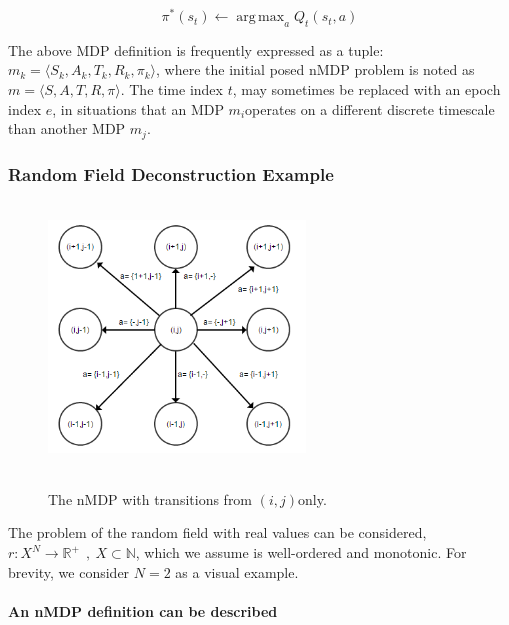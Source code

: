 \documentclass[compsoc,journal,letterpaper,10pt,draftcls,twocolumn]{IEEEtran}
\DeclareMathOperator*{\argmax}{arg\,max}
\begin{document}
\begin{equation}
\pi^{*}\left( s_{t} \right) \leftarrow \argmax_{a}{Q_{t}(s_{t},a)} 
\end{equation}

The above MDP definition is frequently expressed as a tuple:
\(m_{k} = \langle S_{k}, A_{k}, T_{k}, R_{k}, \pi_{k} \rangle\), where the initial posed
nMDP problem is noted as
\(m = \langle S, A, T, R,\pi \rangle \). The time index
\(t\), may sometimes be replaced with an epoch index \(e\), in
situations that an MDP \(m_{i}\)operates on a different discrete
timescale than another MDP \(m_{j}\).

\subsubsection{Random Field Deconstruction
Example}\label{random-field-deconstruction-example}

\begin{center}
\begin{figure}
\includegraphics[width=2.68750in,height=2.80556in]{media/image1.png}\\
\caption{\label{fig:figure1}The nMDP with transitions from \((i,j)\)only.}
\end{figure}
\end{center}

The
problem of the random field with real values can be considered,
\(r:X^{N} \rightarrow \mathbb{R}^{+}\ \ ,\ X\mathbb{\subset N}\), which
we assume is well-ordered and monotonic. For brevity, we consider
\(N = 2\) as a visual example.

\paragraph{An nMDP definition can be
described}\label{an-nmdp-definition-can-be-described}
\end{document}
